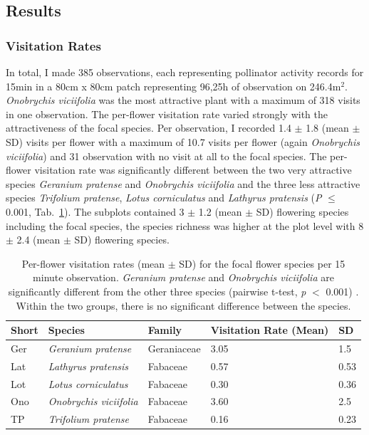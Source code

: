 \label{ch:results_jena}

\subsection{Results}

\subsubsection*{Visitation Rates}			

In total, I made 385 observations, each representing pollinator activity records for 15min in a 80cm x 80cm patch representing 96,25h of observation on 246.4m$^{2}$.\\
\textit{Onobrychis viciifolia} was the most attractive plant with a maximum of 318 visits in one observation. The per-flower visitation rate varied strongly with the attractiveness of the focal species. Per observation, I recorded 1.4 $\pm$ 1.8 (mean $\pm$ SD) visits per flower with a maximum of 10.7 visits per flower (again \textit{Onobrychis viciifolia}) and 31 observation with no visit at all to the focal species. The per-flower visitation rate was significantly different between the two very attractive species \textit{Geranium pratense} and \textit{Onobrychis viciifolia} and the three less attractive species  \textit{Trifolium pratense}, \textit{Lotus corniculatus} and \textit{Lathyrus pratensis} (\textit{P} $\leq$ 0.001, Tab.~\ref{tab:VR_spec}). The subplots contained 3 $\pm$ 1.2 (mean $\pm$ SD) flowering species including the focal species, the species richness was higher at the plot level with 8 $\pm$ 2.4 (mean $\pm$ SD) flowering species.

\begin{table}[!htbp] %
	\centering
	\caption{Per-flower visitation rates (mean $\pm$ SD) for the focal flower species per 15 minute observation. \textit{Geranium pratense} and \textit{Onobrychis viciifolia} are significantly different from the other three species (pairwise t-test, \textit{p} $<$ 0.001) . Within the two groups, there is no significant difference between the species. }
	\begin{tabular}{l l l l l}
		\toprule
		\textbf {Short} & \textbf{Species} & \textbf{Family} &\textbf{Visitation Rate (Mean)} & \textbf{SD} \\
		\midrule
		Ger  & \textit{Geranium pratense} & Geraniaceae & 3.05 & 1.5 \\ %
		Lat  & \textit{Lathyrus pratensis} & Fabaceae & 0.57 & 0.53 \\ %
		Lot  & \textit{Lotus corniculatus} & Fabaceae & 0.30 & 0.36 \\  %
		Ono  & \textit{Onobrychis viciifolia} & Fabaceae & 3.60  &  2.5 \\ %
		TP   & \textit{Trifolium pratense} & Fabaceae & 0.16 & 0.23 \\ %
		\bottomrule
	\end{tabular}%
	\label{tab:VR_spec}
\end{table}%


